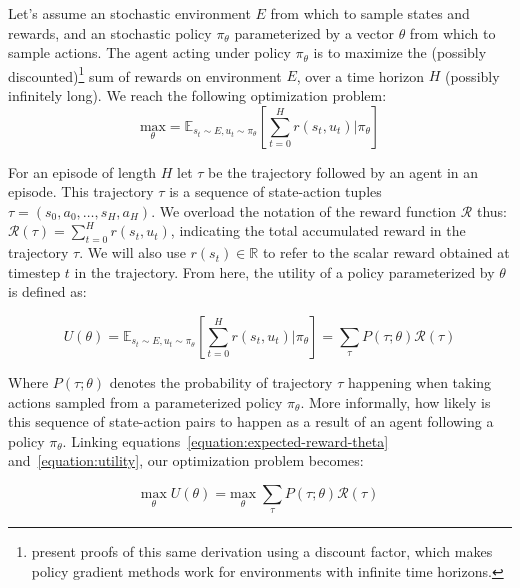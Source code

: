 \documentclass{../main.tex}{subfiles}
\begin{document}
Let's assume an stochastic environment $E$ from which to sample states and rewards, and an stochastic policy $\pi_{\theta}$ parameterized by a vector $\theta$ from which to sample actions. The agent acting under policy $\pi_{\theta}$ is to maximize the (possibly discounted)\footnote{\cite{Williams1992, Sutton1999} present proofs of this same derivation using a discount factor, which makes policy gradient methods work for environments with infinite time horizons.} sum of rewards on environment $E$, over a time horizon $H$ (possibly infinitely long). We reach the following optimization problem:
\begin{equation}\label{equation:expected-reward-theta}
\underset{\theta}{\text{max}} = \mathbb{E}_{s_{t} \sim E, u_t \sim \pi_{\theta}}[\sum^{H}_{t=0} r(s_t, u_t) | \pi_{\theta}]
\end{equation}

For an episode of length $H$ let $\tau$ be the trajectory followed by an agent in an episode. This trajectory $\tau$ is a sequence of state-action tuples $\tau = (s_0, a_0, \dots, s_H, a_H)$. We overload the notation of the reward function $\mathcal{R}$ thus: $\mathcal{R}(\tau) = \sum_{t=0}^{H}r(s_t, u_t)$, indicating the total accumulated reward in the trajectory $\tau$. We will also use $r(s_t) \in \mathbb{R}$ to refer to the scalar reward obtained at timestep $t$ in the trajectory. From here, the utility of a policy parameterized by $\theta$ is defined as:

\begin{equation}\label{equation:utility}
U(\theta) = \mathbb{E}_{s_t \sim E, u_t \sim \pi_{\theta}}[\sum_{t=0}^{H}r(s_t, u_t) | \pi_{\theta}] = \sum_{\tau}P(\tau ; \theta)\mathcal{R}(\tau)
\end{equation}

Where $P(\tau ; \theta)$ denotes the probability of trajectory $\tau$ happening when taking actions sampled from a parameterized policy $\pi_{\theta}$. More informally, how likely is this sequence of state-action pairs to happen as a result of an agent following a policy $\pi_{\theta}$. Linking equations~\ref{equation:expected-reward-theta} and~\ref{equation:utility}, our optimization problem becomes:

\begin{equation}\label{equation:utility-optimization}
\underset{\theta}{\text{max}}\; U(\theta) = \underset{\theta}{\text{max}}\; \sum_{\tau}P(\tau ; \theta)\mathcal{R}(\tau)
\end{equation}
\end{document}
